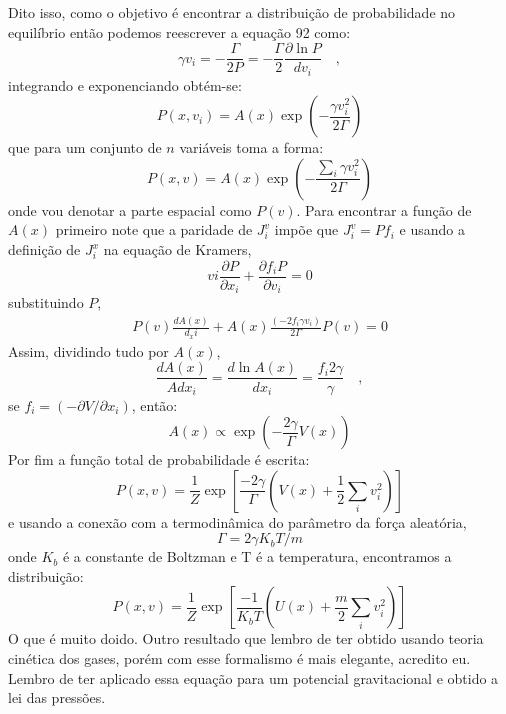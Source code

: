 \documentclass[12pt]{article}
\begin{document}
Dito isso, como o objetivo é encontrar a distribuição de probabilidade no equilíbrio então podemos reescrever a equação 92 como:
\begin{equation}
\gamma v_i = - \frac{\Gamma}{2 P} = -\frac{\Gamma}{2}\frac{\partial \ln P}{d v_i} \quad,
\end{equation}
integrando e exponenciando obtém-se:
\begin{equation}
P(x, v_i) = A(x)\exp\left(-\frac{\gamma v_i^2}{2\Gamma} \right) 
\end{equation}
que para um conjunto de $n$ variáveis toma a forma:
\begin{equation}
P(x, v) = A(x)\exp\left(-\frac{\sum_i\gamma v_i^2}{2\Gamma} \right) 
\end{equation}
onde vou denotar a parte espacial como $P(v)$.
Para encontrar a função de $A(x)$ primeiro note que a paridade de $J_i^v$ impõe que $J_i^v = Pf_i$ e usando a definição de $J_i^x$ na equação de Kramers,
\begin{equation}
vi\frac{\partial P}{\partial x_i} + \frac{\partial f_iP}{\partial v_i} = 0 
\end{equation}
substituindo $P$, 
\begin{equation}
\begin{split}
P(v)\frac{dA(x)}{d_xi} + A(x)\frac{(-2f_i\gamma v_i)}{2\Gamma} P(v) = 0
\end{split}
\end{equation}
Assim, dividindo tudo por $A(x)$,
\begin{equation}
\frac{dA(x)}{Adx_i} = \frac{d \ln A(x)}{dx_i} = \frac{f_i 2\gamma}{\gamma} \quad,
\end{equation}
se $f_i = (-\partial V /\partial x_i)$, então:
\begin{equation}
A(x) \propto \exp \left( -\frac{2\gamma}{\Gamma}V(x)\right)
\end{equation}
Por fim a função total de probabilidade é escrita:\begin{equation}
P(x,v) = \frac{1}{Z} \exp\left[\frac{-2\gamma}{\Gamma}\left(V(x) + \frac{1}{2}\sum_i v_i^2 \right)\right]
\end{equation}
e usando a conexão com a termodinâmica do parâmetro da força aleatória,
\begin{equation}
\Gamma = 2\gamma K_b T/m 
\end{equation}
onde $K_b$ é a constante de Boltzman e T é a temperatura, encontramos a distribuição:
\begin{equation}
P(x,v) = \frac{1}{Z} \exp\left[\frac{-1}{K_bT}\left(U(x) + \frac{m}{2}\sum_i v_i^2 \right)\right]
\end{equation}
O que é muito doido. Outro resultado que lembro de ter obtido usando teoria cinética dos gases, porém com esse formalismo é mais elegante, acredito eu. Lembro de ter aplicado essa equação para um potencial gravitacional e obtido a lei das pressões.
\end{document}
